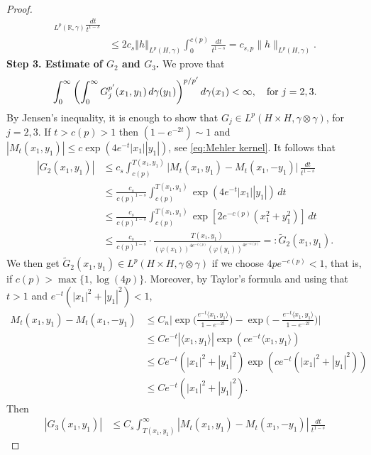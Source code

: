 \documentclass[a4paper,10pt,reqno]{amsart}
\newcommand{\R}{\mathbb{R}}
\numberwithin{equation}{section}
\begin{document}
\begin{proof}
\begin{align*}
_{L^{p}(\R,\gamma)}\frac{dt}{t^{1-s}} \\
&\leq 2c_s\left\Vert h\right\Vert _{L^{p}(H,\gamma)}\int_{0}^{c(p)}\frac{dt}{t^{1-s}}
=c_{s,p}\|h\|_{L^p(H,\gamma)}.
\end{align*}
\noindent\textbf{Step 3. Estimate of $G_{2}$ and $G_{3}$.} We prove that
$$\int_0^\infty\left(\int_0^\infty G_{j}^{p'}(x_{1},y_{1})\,d\gamma(y_{1})\right)^{p/p'}
d\gamma(x_{1})<\infty,\quad\hbox{for}~j=2,3.$$
By Jensen's inequality, it is enough to show that $G_{j}\in L^{p}(H\times H,\gamma\otimes\gamma)$, for $j=2,3$.
If $t>c(p)>1$ then $(1-e^{-2t})\sim1$ and $\left\vert M_{t}(x_{1},y_{1})\right\vert\leq
c\exp\left(  4e^{-t}\left\vert x_{1}\right\vert\left\vert y_{1}\right\vert \right)$, see \eqref{eq:Mehler kernel}.
It follows that
\begin{align*}
\left\vert G_{2}(x_{1},y_{1})\right\vert
&\leq c_s\int_{c(p)}^{T(x_{1},y_{1})}\vert M_{t}(x_{1},y_{1})-M_{t}(x_{1},-y_{1})\vert\,\frac{dt}{t^{1-s}} \\
& \leq \frac{c_s}{c(p)^{1-s}}\int_{c(p)}^{T(x_{1},y_{1})}\exp(4e^{-t}|x_{1}||y_{1}|)\,dt \\
& \leq \frac{c_s}{c(p)^{1-s}}\int_{c(p)}^{T(x_{1},y_{1})}\exp\left[2e^{-c(p)}(x_{1}^{2}+y_{1}^{2})\right]\,dt \\
& \leq\frac{c_s}{c(p)^{1-s}}\cdot\frac{T(x_{1},y_{1})}{\left(  \varphi(x_{1})\right)  ^{4e^{-c(p)}}
\left(\varphi(y_{1})\right)  ^{4e^{-c(p)}}}=:\widetilde{G}_{2}(x_{1},y_{1}).
\end{align*}
We then get $\widetilde{G}_{2}(x_{1},y_{1})\in L^{p}(H\times H,\gamma\otimes\gamma)$
if we choose $4pe^{-c(p)}<1$, that is, if $c(p)>\max\{1,\log(4p)\}$. Moreover, by Taylor's formula
and using that $t>1$ and $e^{-t}(|x_1|^2+|y_1|^2)<1$,
\begin{align*}
M_{t}(x_{1},y_{1})-M_{t}(x_{1},-y_{1}) &\leq C_n
\Big|\exp\Big(\frac{e^{-t}\langle x_1,y_1\rangle}{1-e^{-2t}}\Big)-\exp\Big(-\frac{e^{-t}\langle x_1,y_1\rangle}{1-e^{-2t}}\Big)\Big| \\
&\leq Ce^{-t}|\langle x_1,y_1\rangle|\exp(ce^{-t}\langle x_1,y_1\rangle) \\
&\leq Ce^{-t}(|x_1|^2+|y_1|^2)\exp(ce^{-t}(|x_1|^2+|y_1|^2)) \\
&\leq Ce^{-t}(|x_1|^2+|y_1|^2).
\end{align*}
Then
\begin{align*}
\left\vert G_{3}(x_{1},y_{1})\right\vert  &  \leq C_s\int_{T(x_{1},y_{1})}^{\infty}
\left\vert M_{t}(x_{1},y_{1})-M_{t}(x_{1},-y_{1})\right\vert\,\frac{dt}{t^{1-s}}

\end{align*}
\end{proof}
\end{document}
